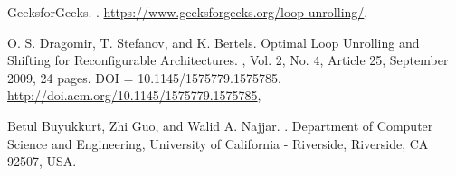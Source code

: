 \documentclass[a4paper,twocolumn]{article}
\begin{document}
	
\begin{thebibliography}{99} %

    GeeksforGeeks.
    .
    \newblock \url{https://www.geeksforgeeks.org/loop-unrolling/}, \newblock [online]
    
    O. S. Dragomir, T. Stefanov, and K. Bertels.
    \newblock Optimal Loop Unrolling and Shifting for Reconfigurable Architectures.
    , Vol. 2, No. 4, Article 25, September 2009, 24 pages.
    \newblock DOI = 10.1145/1575779.1575785.
    \newblock \url{http://doi.acm.org/10.1145/1575779.1575785}, \newblock [online]

    Betul Buyukkurt, Zhi Guo, and Walid A. Najjar.
    .
    \newblock Department of Computer Science and Engineering, University of California - Riverside, Riverside, CA 92507, USA.
    
\end{thebibliography}


	
	
\end{document}
